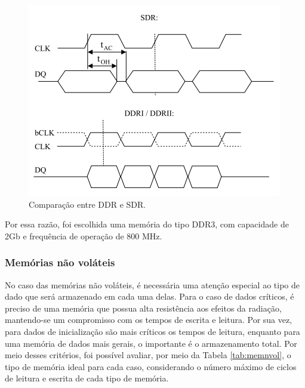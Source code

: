 \begin{figure}[H]
    \centering
    \includegraphics[scale=1]{images/ddrsdr.png}
    \caption{Comparação entre DDR e SDR.}
    \label{fig:sdrvsddr}
\end{figure}
 
Por essa razão, foi escolhida uma memória do tipo DDR3, com capacidade de 2Gb e frequência de operação de 800 MHz.

\subsubsection{Memórias não voláteis}

No caso das memórias não voláteis, é necessária uma atenção especial ao tipo de dado que será armazenado em cada uma delas. Para o caso de dados críticos, é preciso de uma memória que possua alta resistência aos efeitos da radiação, mantendo-se um compromisso com os tempos de escrita e leitura. Por sua vez, para dados de inicialização são mais críticos os tempos de leitura, enquanto para uma memória de dados mais gerais, o importante é o armazenamento total. Por meio desses critérios, foi possível avaliar, por meio da Tabela \ref{tab:memnvol}, o tipo de memória ideal para cada caso, considerando o número máximo de ciclos de leitura e escrita de cada tipo de memória.

